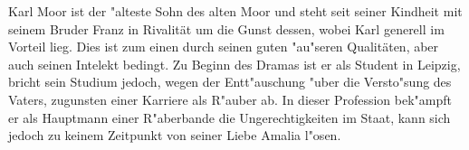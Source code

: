 Karl Moor ist der "alteste Sohn des alten Moor und steht seit seiner Kindheit mit seinem Bruder Franz in Rivalität um die Gunst dessen, wobei Karl generell im Vorteil lieg. Dies ist zum einen durch seinen guten "au"seren Qualitäten, aber auch seinen Intelekt bedingt.
Zu Beginn des Dramas ist er als Student in Leipzig, bricht sein Studium jedoch, wegen der Entt"auschung "uber die Versto"sung des Vaters, zugunsten einer Karriere als R"auber ab. In dieser Profession bek"ampft er als Hauptmann einer R"aberbande die Ungerechtigkeiten im Staat, kann sich jedoch zu keinem Zeitpunkt von seiner Liebe Amalia l"osen.
